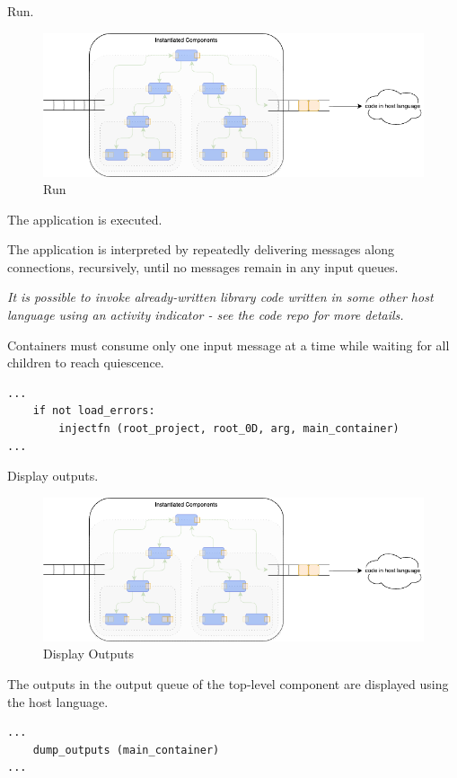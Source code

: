 \documentclass[10pt,anonymous,review]{acmart}
\begin{document}
\item Run.
  \begin{figure}[h]
    \centering
    \includegraphics[width=0.8\linewidth]{./media/image7.png}
    \caption{Run}
    \label{fig:run}
  \end{figure}
The application is executed.

The application is interpreted by repeatedly delivering messages along
connections, recursively, until no messages remain in any input queues.

\emph{It is possible to invoke already-written library code written in some other host language using an activity indicator - see the code repo for more details.}

Containers must consume only one input message at a time while waiting
for all children to reach quiescence.

\begin{verbatim}
...
    if not load_errors:
        injectfn (root_project, root_0D, arg, main_container)
...
\end{verbatim}
  
\item Display outputs.
  \begin{figure}[h]
    \centering
    \includegraphics[width=0.8\linewidth]{./media/image7.png}
    \caption{Display Outputs}
    \label{fig:display}
  \end{figure}

The outputs in the output queue of the top-level component are displayed
using the host language.

\begin{verbatim}
...
    dump_outputs (main_container)
...
\end{verbatim}
  
\end{document}
